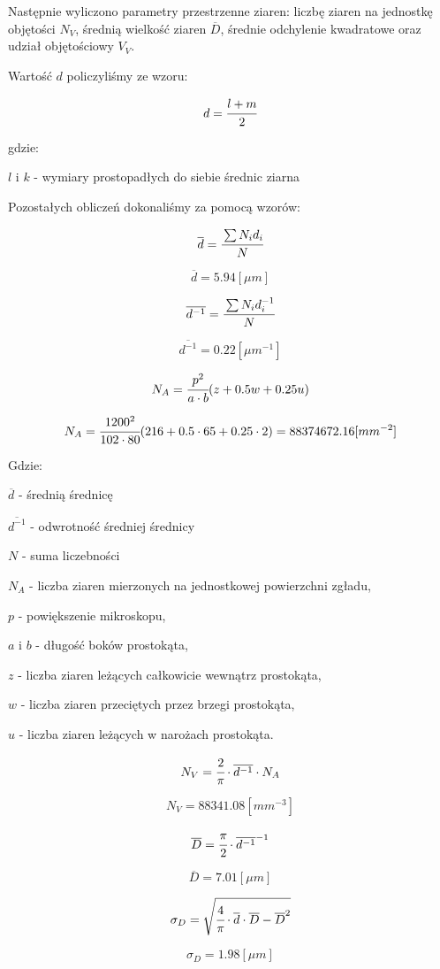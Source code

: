 \documentclass[a4paper,12pt]{article}
\begin{document}
Następnie wyliczono parametry przestrzenne ziaren: liczbę ziaren na jednostkę objętości $N_V$, średnią wielkość ziaren $\overline{D}$, średnie odchylenie kwadratowe oraz udział objętościowy $V_V$.

Wartość $d$ policzyliśmy ze wzoru:

$$d=\cfrac{l+m}{2}$$

gdzie:

$l$ i $k$ - wymiary prostopadłych do siebie średnic ziarna





Pozostałych obliczeń dokonaliśmy za pomocą wzorów:

$$\overline{d}=\cfrac{\sum N_id_i}{N}$$

$$\overline{d}=5.94[\mu m]$$

$$\overline{d^{-1}}=\cfrac{\sum N_id_i^{-1}}{N}$$

$$\overline{d^{-1}}=0.22[\mu m^{-1}]$$

$$N_A=\cfrac{p^2}{a\cdot b}(z+0.5w+0.25u)$$

$$N_A=\cfrac{1200^2}{102\cdot 80}(216+0.5\cdot 65+0.25\cdot 2)=88374672.16[mm^{-2}]$$

Gdzie:

$\overline{d}$ - średnią średnicę

$\overline{d^{-1}}$ - odwrotność średniej średnicy

$N$ - suma liczebności

$N_A$ - liczba ziaren mierzonych na jednostkowej powierzchni zgładu,

$p$ - powiększenie mikroskopu,

$a$ i $b$ - długość boków prostokąta,

$z$ - liczba ziaren leżących całkowicie wewnątrz prostokąta,

$w$ - liczba ziaren przeciętych przez brzegi prostokąta,

$u$ - liczba ziaren leżących w narożach prostokąta.

$$N_V=\cfrac{2}{\pi}\cdot \overline{d^{-1}} \cdot N_A$$

$$N_V=88341.08[mm^{-3}]$$

$$\overline{D}=\cfrac{\pi}{2}\cdot \overline{d^{-1}}^{-1}$$

$$\overline{D}=7.01[\mu m]$$

$$\sigma_D=\sqrt{\cfrac{4}{\pi}\cdot \overline{d}\cdot \overline{D} - \overline{D}^2}$$

$$\sigma_D=1.98 [\mu m]$$
\end{document}
